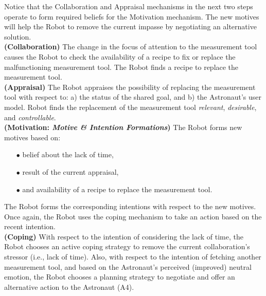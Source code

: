 Notice that the Collaboration and Appraisal mechanisms in the next two steps
operate to form required beliefs for the Motivation mechanism. The new motives
will help the Robot to remove the current impasse by negotiating an alternative
solution.\\

\noindent\textbf{(Collaboration)} The change in the focus of attention to the
measurement tool causes the Robot to check the availability of a recipe to fix
or replace the malfunctioning measurement tool. The Robot finds a recipe to
replace the measurement tool.\\

\noindent\textbf{(Appraisal)} The Robot appraises the possibility of
replacing the measurement tool with respect to: a) the status of the shared
goal, and b) the Astronaut's user model. Robot finds the replacement of the
measurement tool \textit{relevant}, \textit{desirable}, and
\textit{controllable}.\\

\noindent\textbf{(Motivation: \textit{Motive \& Intention Formations})} The
Robot forms new motives based on:

\begin{itemize}
  \item[$\bullet$] belief about the lack of time,
  \item[$\bullet$] result of the current appraisal,
  \item[$\bullet$] and availability of a recipe to replace the measurement tool.
\end{itemize}

\noindent The Robot forms the corresponding intentions with respect to the new
motives. Once again, the Robot uses the coping mechanism to take an action
based on the recent intention.\\

\noindent\textbf{(Coping)} With respect to the intention of considering the
lack of time, the Robot chooses an active coping strategy to remove the current
collaboration's stressor (i.e., lack of time). Also, with respect to the
intention of fetching another measurement tool, and based on the Astronaut's
perceived (improved) neutral emotion, the Robot chooses a planning strategy to
negotiate and offer an alternative action to the Astronaut (A4).\\

\noindent{}\\

